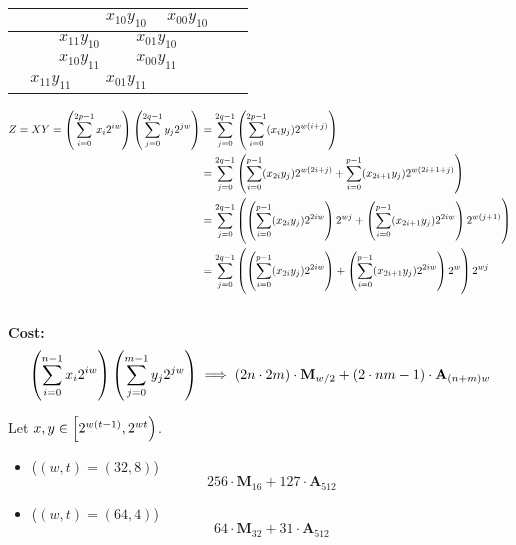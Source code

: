 \begin{center}
\begin{tabular}{|c|c|c|c|c|c|c|c|}
\hspace{15pt} & \hspace{15pt} & \multicolumn{2}{c|}{$x_{10}y_{10}$} & \multicolumn{2}{c|}{$x_{00}y_{10}$} & \hspace{15pt} & \hspace{15pt} \\ \hline
\hspace{15pt} & \multicolumn{2}{c|}{$x_{11}y_{10}$} & \multicolumn{2}{c|}{$x_{01}y_{10}$} & \hspace{15pt} & \hspace{15pt} & \hspace{15pt} \\ \hline\hline
\hspace{15pt} & \multicolumn{2}{c|}{$x_{10}y_{11}$} & \multicolumn{2}{c|}{$x_{00}y_{11}$} & \hspace{15pt} & \hspace{15pt} & \hspace{15pt} \\ \hline
\multicolumn{2}{|c|}{$x_{11}y_{11}$} & \multicolumn{2}{c|}{$x_{01}y_{11}$} & \hspace{15pt} & \hspace{15pt} & \hspace{15pt} & \hspace{15pt} \\ \hline
\end{tabular}
\end{center}
\begin{align*}
Z=XY=\left(\sum_{i=0}^{2p-1}x_i2^{iw}\right)\left(\sum_{j=0}^{2q-1}y_j2^{jw}\right)&=\sum_{j=0}^{2q-1}\left(\sum_{i=0}^{2p-1}(x_iy_j)2^{w(i+j)}\right) \\
&=\sum_{j=0}^{2q-1}\left(\sum_{i=0}^{p-1}(x_{2i}y_j)2^{w(2i+j)}+\sum_{i=0}^{p-1}(x_{2i+1}y_j)2^{w(2i+1+j)}\right) \\
&=\sum_{j=0}^{2q-1}\left(\left(\sum_{i=0}^{p-1}(x_{2i}y_j)2^{2iw}\right)2^{wj}+\left(\sum_{i=0}^{p-1}(x_{2i+1}y_j)2^{2iw}\right)2^{w(j+1)}\right) \\
&=\sum_{j=0}^{2q-1}\left(\left(\sum_{i=0}^{p-1}(x_{2i}y_j)2^{2iw}\right)+\left(\sum_{i=0}^{p-1}(x_{2i+1}y_j)2^{2iw}\right)2^{w}\right)2^{wj} \\
\end{align*}
\\
\textbf{Cost:} \[
\left(\sum_{i=0}^{n-1}x_i2^{iw}\right)\left(\sum_{j=0}^{m-1}y_j2^{jw}\right)\implies\left(2n\cdot 2m\right)\cdot\textbf{M}_{w/2} + (2\cdot nm - 1)\cdot\textbf{A}_{(n+m)w}
\]

\begin{example}
Let $x,y\in\intco{2^{w(t-1)},2^{wt}}$.
\begin{itemize}
\item[] ($(w,t)=(32,8)$) \[
256\cdot\textbf{M}_{16} + 127\cdot\textbf{A}_{512}
\]
\item[] ($(w,t)=(64,4)$) \[
64\cdot\textbf{M}_{32} + 31\cdot\textbf{A}_{512}
\]
\end{itemize}
\end{example}








